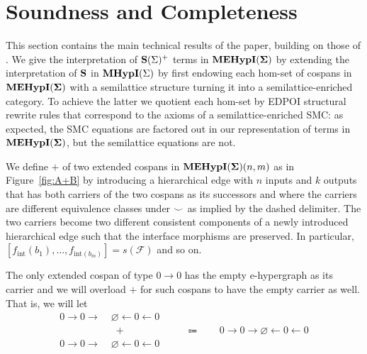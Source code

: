 \section{Soundness and Completeness}\label{sec:soundness-and-completeness}

This section contains the main technical results of the paper,  building on those of \cite{bonchi_string_2022-2}.
We give the interpretation of $\mathbf{S}(\Sigma)^{+}$ terms in ${\mathbf{MEHypI(\Sigma)}}$ by extending the interpretation of $\mathbf{S}$ in $\textbf{MHypI}(\Sigma)$ by first endowing each hom-set of cospans in ${\mathbf{MEHypI(\Sigma)}}$ with a semilattice structure turning it into a semilattice-enriched category.
To achieve the latter we quotient each hom-set by EDPOI structural rewrite rules that correspond to the axioms of a semilattice-enriched SMC:
as expected,  the SMC equations are factored out in our representation of terms in ${\mathbf{MEHypI(\Sigma)}}$,  but the semilattice equations are not.  


\begin{definition}
We define $+$ of two extended cospans in ${\mathbf{MEHypI(\Sigma)}}(n,m)$ as in Figure~\ref{fig:A+B}
by introducing a hierarchical edge with $n$ inputs and $k$ outputs that has both carriers of the two cospans as its successors and where the carriers are different equivalence classes under ${\smile}$ as implied by the dashed delimiter.
The two carriers become two different consistent components of a newly introduced hierarchical edge such that the interface morphisms are preserved.
In particular, $[f_{\text{int}}(b_1), \ldots, f_{\text{int}(b_{m})}] = s(\mathcal{F})$ and so on.

The only extended cospan of type $0 \to 0$ has the empty e-hypergraph as its carrier and we will overload $+$ for such cospans to have the empty carrier as well.
That is, we will let 
\begin{align*}
	0 \to 0 \to \;&\varnothing \xleftarrow{} 0 \xleftarrow{} 0\\
	&\;+ \hspace{6em} \Coloneqq \hspace{2em} 0 \to 0 \to \varnothing \xleftarrow{} 0 \xleftarrow{} 0\\
	0 \to 0 \to \;&\varnothing \xleftarrow{} 0 \xleftarrow{} 0
\end{align*}
\end{definition}

